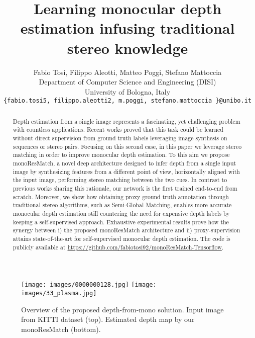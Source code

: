 \documentclass[10pt,twocolumn,letterpaper]{article}
\begin{document}
\title{Learning monocular depth estimation infusing traditional stereo knowledge}

\author{Fabio Tosi, Filippo Aleotti, Matteo Poggi, Stefano Mattoccia\\
Department of Computer Science and Engineering (DISI)\\
University of Bologna, Italy\\
{\tt\small \{fabio.tosi5, filippo.aleotti2, m.poggi, stefano.mattoccia \}@unibo.it}
}

\maketitle



\begin{abstract}
Depth estimation from a single image represents a fascinating, yet challenging problem with countless applications. Recent works proved that this task could be learned without direct supervision from ground truth labels leveraging image synthesis on sequences or stereo pairs. Focusing on this second case, in this paper we leverage stereo matching in order to improve monocular depth estimation. To this aim we propose monoResMatch, a novel deep architecture designed to infer depth from a single input image by synthesizing features from a different point of view, horizontally aligned with the input image, performing stereo matching
between the two cues. In contrast to previous works sharing this rationale, our network is the first trained end-to-end from scratch.
Moreover, we show how obtaining proxy ground truth annotation through traditional stereo algorithms, such as Semi-Global Matching, enables more accurate monocular depth estimation still countering the need for expensive depth labels by keeping a self-supervised approach. Exhaustive experimental results prove how the synergy between i) the proposed monoResMatch architecture and ii) proxy-supervision attains state-of-the-art for self-supervised monocular depth estimation. The code is publicly available at \url{https://github.com/fabiotosi92/monoResMatch-Tensorflow}.

\end{abstract}

\begin{figure}
\centering
\texttt{[image: images/0000000128.jpg]} 
\texttt{[image: images/33\_plasma.jpg]} 
\caption{Overview of the proposed depth-from-mono solution. Input image from KITTI dataset (top). Estimated depth map by our monoResMatch (bottom).}
\label{fig:abstract}
\end{figure}
 
\end{document}

